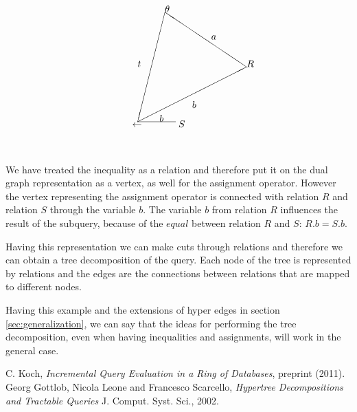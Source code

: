 \documentclass[12pt]{article}
\begin{document}
\begin{align}
\label{hyper3}
\setlength{\unitlength}{1mm}
\begin{picture}(50,50)
\put(50,30){\line(-3,2){30}}
\put(20,50){\line(-1,-4){10}}
\put(10,10){\line(2,1){40}}
\put(10,10){\line(5,0){14}}
\put(50,30){$R$}
\put(20,50){$\theta$}
\put(8,8){$\gets$}
\put(25,8){$S$}
\put(30,15){$b$}
\put(37,40){$a$}
\put(10,30){$t$}
\put(18,10){$b$}
\end{picture}
\end{align}

We have treated the inequality as a relation and therefore put it on the dual graph representation as a vertex, as well for the assignment operator. However the vertex representing the assignment operator is connected with relation $R$ and relation $S$ through the variable $b$. The variable $b$ from relation $R$ influences the result of the subquery, because of the $equal$ between relation $R$ and $S$: $R.b=S.b$.

Having this representation we can make cuts through relations and therefore we can obtain a tree decomposition of the query. Each node of the tree is represented by relations and the edges are the connections between relations that are mapped to different nodes.

Having this example and the extensions of hyper edges in section \ref{sec:generalization}, we can say that the ideas for performing the tree decomposition, even when having inequalities and assignments, will work in the general case. 

\begin{thebibliography}{9}
 C. Koch, \emph{Incremental Query Evaluation in a Ring of Databases},  preprint (2011).
 Georg Gottlob, Nicola Leone and Francesco Scarcello, \emph{Hypertree Decompositions and Tractable Queries} J. Comput. Syst. Sci., 2002.
\end{thebibliography}
\end{document}
